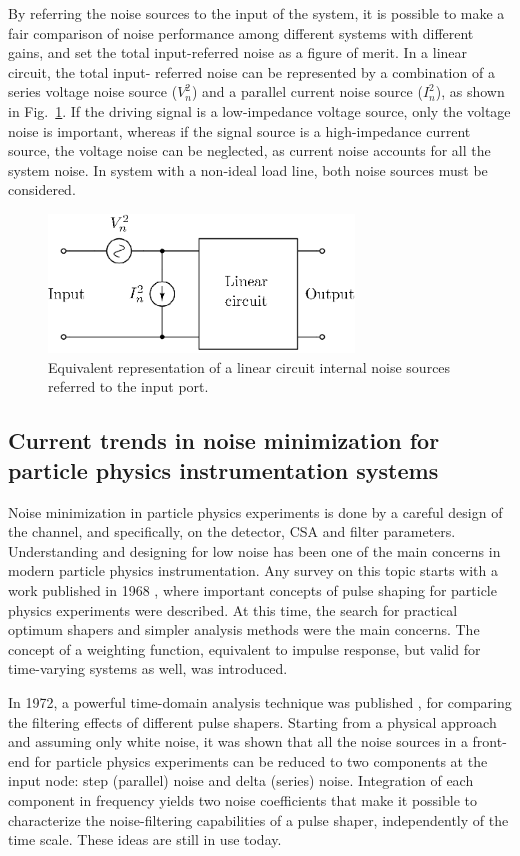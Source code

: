 By referring the noise sources to the input of the system, it is possible to make a fair comparison of noise performance among different systems with different gains, and set the total input-referred noise as a figure of merit. In a linear circuit, the total input- referred noise can be represented by a combination of a series voltage noise source ($V_n^2$) and a parallel current noise source ($I_n^2$), as shown in Fig.~\ref{fig:noise_cir}. If the driving signal is a low-impedance voltage source, only the voltage noise is important, whereas if the signal source is a high-impedance current source, the voltage noise can be neglected, as current noise accounts for all the system noise. In system with a non-ideal load line, both noise sources must be considered.

\begin{figure}[!t]
	\centering
	\includegraphics[width=3.2in]{./Figures/noise_cir}
	\caption{Equivalent representation of a linear circuit internal noise sources referred to the input port.}\label{fig:noise_cir}
\end{figure}

\subsection{Current trends in noise minimization for particle physics instrumentation systems}
Noise minimization in particle physics experiments is done by a careful design of the channel, and specifically, on the detector, CSA and filter parameters. Understanding and designing for low noise has been one of the main concerns in modern particle physics instrumentation. Any survey on this topic starts with a work published in 1968 \citep{radeka104}, where important concepts of pulse shaping for particle physics experiments were described. At this time, the search for practical optimum shapers and simpler analysis methods were the main concerns. The concept of a weighting function, equivalent to impulse response, but valid for time-varying systems as well, was introduced.

In 1972, a powerful time-domain analysis technique was published \citep{goulding101}, for comparing the filtering effects of different pulse shapers. Starting from a physical approach and assuming only white noise, it was shown that all the noise sources in a front-end for particle physics experiments can be reduced to two components at the input node: step (parallel) noise and delta (series) noise. Integration of each component in frequency yields two noise coefficients that make it possible to characterize the noise-filtering capabilities of a pulse shaper, independently of the time scale. These ideas are still in use today.

